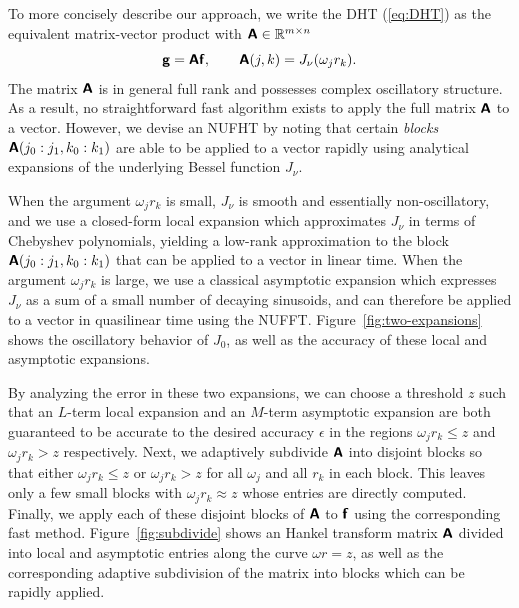 
To more concisely describe our approach, we write the DHT (\ref{eq:DHT}) as the
equivalent matrix-vector product with $\bm{\mathsf{A}} \in \mathbb{R}^{m \times n}$
\begin{equation}
    \bm{\mathsf{g}} = \bm{\mathsf{A}}\bm{\mathsf{f}}, \qquad \bm{\mathsf{A}}(j,k) = J_\nu(\omega_j r_k).
\end{equation}
The matrix $\bm{\mathsf{A}}$ is in general full rank and possesses complex oscillatory
structure. As a result, no straightforward fast algorithm exists to apply the
full matrix $\bm{\mathsf{A}}$ to a vector. However, we devise an NUFHT by noting that
certain \textit{blocks} $\bm{\mathsf{A}}(j_0:j_1, k_0:k_1)$ are able to be applied to a
vector rapidly using analytical expansions of the underlying Bessel function
$J_\nu$. 

When the argument $\omega_j r_k$ is small, $J_\nu$ is smooth and essentially
non-oscillatory, and we use a closed-form local expansion which approximates
$J_\nu$ in terms of Chebyshev polynomials, yielding a low-rank approximation to
the block $\bm{\mathsf{A}}(j_0:j_1, k_0:k_1)$ that can be applied to a vector in linear
time. When the argument $\omega_j r_k$ is large, we use a classical asymptotic
expansion which expresses $J_\nu$ as a sum of a small number of decaying
sinusoids, and can therefore be applied to a vector in quasilinear time using
the NUFFT. Figure~\ref{fig:two-expansions} shows the oscillatory behavior of
$J_0$, as well as the accuracy of these local and asymptotic expansions.

By analyzing the error in these two expansions, we can choose a threshold $z$
such that an $L$-term local expansion and an $M$-term asymptotic expansion are
both guaranteed to be accurate to the desired accuracy $\epsilon$ in the regions
$\omega_j r_k \leq z$ and $\omega_j r_k > z$ respectively. Next, we adaptively
subdivide $\bm{\mathsf{A}}$ into disjoint blocks so that either $\omega_j r_k \leq z$ or
$\omega_j r_k > z$ for all $\omega_j$ and all $r_k$ in each block. This leaves
only a few small blocks with $\omega_j r_k \approx z$ whose entries are directly
computed. Finally, we apply each of these disjoint blocks of $\bm{\mathsf{A}}$ to
$\bm{\mathsf{f}}$ using the corresponding fast method. Figure~\ref{fig:subdivide} shows
an Hankel transform matrix $\bm{\mathsf{A}}$ divided into local and asymptotic entries
along the curve $\omega r = z$, as well as the corresponding adaptive
subdivision of the matrix into blocks which can be rapidly applied.

